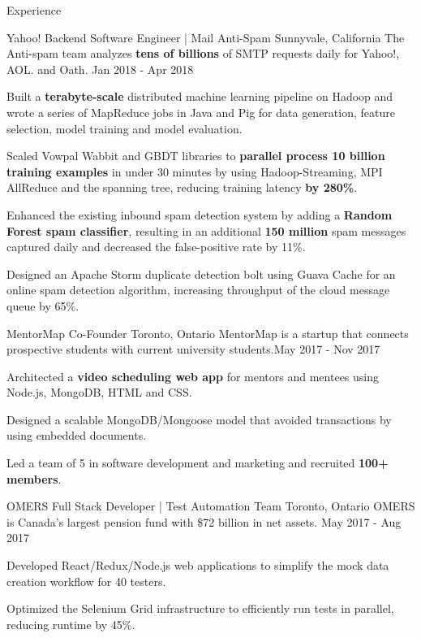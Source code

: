 \documentclass{resume} %
\begin{document}
\begin{rSection}{Experience}

\begin{expSec}
{Yahoo!}
{Backend Software Engineer | Mail Anti-Spam}
{Sunnyvale, California}
{The Anti-spam team analyzes \textbf{tens of billions} of SMTP requests daily for Yahoo!, AOL. and Oath.}
{Jan 2018 - Apr 2018}
\item Built a \textbf{terabyte-scale} distributed machine learning pipeline on Hadoop and wrote a series of MapReduce jobs in Java and Pig for data generation, feature selection, model training and model evaluation.
\item Scaled Vowpal Wabbit and GBDT libraries to \textbf{parallel process 10 billion training examples} in under 30 minutes by using Hadoop-Streaming, MPI AllReduce and the spanning tree, reducing training latency \textbf{by 280\%}.
\item Enhanced the existing inbound spam detection system by adding a \textbf{Random Forest spam classifier}, resulting in an additional \textbf{150 million} spam messages captured daily and decreased the false-positive rate by 11\%.
\item Designed an Apache Storm duplicate detection bolt using Guava Cache for an online spam detection algorithm, increasing throughput of the cloud message queue by 65\%.

\end{expSec}

\begin{expSec}
{MentorMap}
{Co-Founder \href{https://www.mentormap.ca/}{\space\small\faExternalLink}}
{Toronto, Ontario}
{MentorMap is a startup that connects prospective students with current university students.}{May 2017 - Nov 2017}
\item Architected a \textbf{video scheduling web app} for mentors and mentees using Node.js, MongoDB, HTML and CSS.
\item Designed a scalable MongoDB/Mongoose model that avoided transactions by using embedded documents.
\item Led a team of 5 in software development and marketing and recruited \textbf{100+ members}.
\end{expSec}

\begin{expSec}
{OMERS}
{Full Stack Developer | Test Automation Team}
{Toronto, Ontario}
{OMERS is Canada's largest pension fund with \$72 billion in net assets.}
{May 2017 - Aug 2017}
\item Developed React/Redux/Node.js web applications to simplify the mock data creation workflow for 40 testers.
\item Optimized the Selenium Grid infrastructure to efficiently run tests in parallel, reducing runtime by 45\%. \end{expSec}

\end{rSection}
\end{document}
